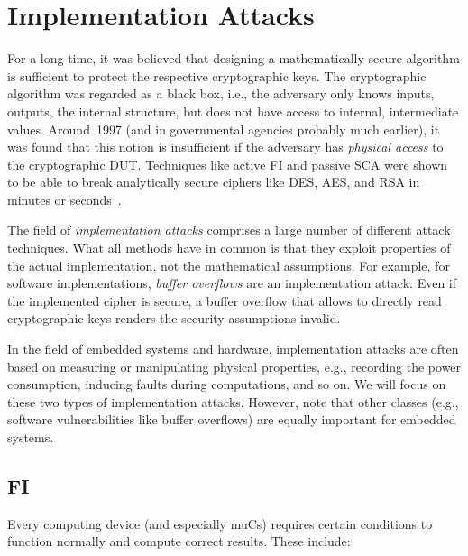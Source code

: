 
\chapter{Implementation Attacks}
\thispagestyle{fancy}
\label{chap:impl_attacks}
For a long time, it was believed that designing a mathematically secure algorithm is sufficient to protect the respective cryptographic keys. The cryptographic algorithm was regarded as a black box, i.e., the adversary only knows inputs, outputs, the internal structure, but does not have access to internal, intermediate values. Around~1997 (and in governmental agencies probably much earlier), it was found that this notion is insufficient if the adversary has \emph{physical access} to the cryptographic \ac{DUT}. Techniques like active \acf{FI} and passive \acf{SCA} were shown to be able to break analytically secure ciphers like \ac{DES}, \ac{AES}, and \ac{RSA} in minutes or seconds~\cite{dpa_kocher,BonehDemilloLipton97,timing_kocher}. 

The field of \emph{implementation attacks} comprises a large number of different attack techniques. What all methods have in common is that they exploit properties of the actual implementation, not the mathematical assumptions. For example, for software implementations, \emph{buffer overflows} are an implementation attack: Even if the implemented cipher is secure, a buffer overflow that allows to directly read cryptographic keys renders the security assumptions invalid. 

In the field of embedded systems and hardware, implementation attacks are often based on measuring or manipulating physical properties, e.g., recording the power consumption, inducing faults during computations, and so on. We will focus on these two types of implementation attacks. However, note that other classes (e.g., software vulnerabilities like buffer overflows) are equally important for embedded systems.

\section{\acl{FI}}
Every computing device (and especially \acp{muC}) requires certain conditions to function normally and compute correct results. These include:

